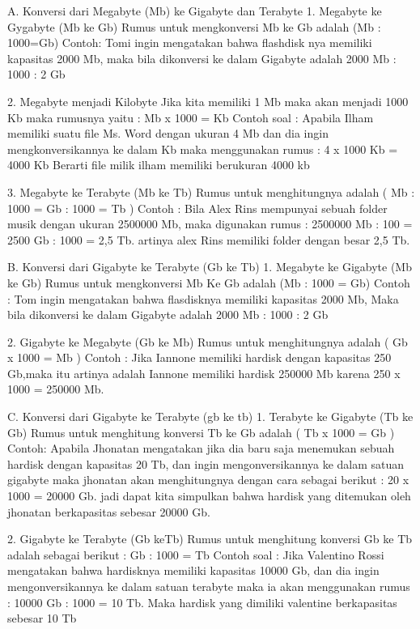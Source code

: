 A.	Konversi dari Megabyte (Mb) ke Gigabyte dan Terabyte
1.	Megabyte ke Gygabyte (Mb ke Gb)
	Rumus untuk mengkonversi Mb ke Gb adalah (Mb : 1000=Gb)
	Contoh: 
	Tomi ingin mengatakan bahwa flashdisk nya memiliki kapasitas 2000 Mb, maka bila dikonversi  ke dalam Gigabyte adalah 2000 Mb : 1000 : 2 Gb 

2.	Megabyte menjadi Kilobyte
Jika kita memiliki 1 Mb maka akan menjadi 1000 Kb maka rumusnya yaitu :
Mb x 1000 = Kb
Contoh soal :
Apabila Ilham memiliki suatu file Ms. Word dengan ukuran 4 Mb dan dia ingin mengkonversikannya ke dalam Kb maka menggunakan rumus :
4 x 1000 Kb = 4000 Kb
Berarti file milik ilham memiliki berukuran 4000 kb

3.	Megabyte ke Terabyte (Mb ke Tb)
Rumus untuk menghitungnya adalah ( Mb : 1000 = Gb : 1000 = Tb )
Contoh :
Bila Alex Rins mempunyai sebuah folder musik dengan ukuran 2500000 Mb, maka digunakan rumus : 2500000 Mb : 100 = 2500 Gb : 1000 = 2,5 Tb.
artinya alex Rins memiliki folder dengan besar 2,5 Tb.

B.	Konversi dari Gigabyte ke Terabyte (Gb ke Tb)
1.	Megabyte ke Gigabyte (Mb ke Gb)
Rumus untuk mengkonversi Mb Ke Gb adalah (Mb : 1000 = Gb)
Contoh :
Tom ingin mengatakan bahwa flasdisknya memiliki kapasitas 2000 Mb, Maka bila dikonversi ke dalam Gigabyte adalah 2000 Mb : 1000 : 2 Gb

2.	Gigabyte ke Megabyte (Gb ke Mb)
Rumus untuk menghitungnya adalah ( Gb x 1000 = Mb )
Contoh :
Jika Iannone memiliki hardisk dengan kapasitas 250 Gb,maka itu artinya adalah Iannone memiliki hardisk 250000 Mb karena 250 x 1000 = 250000 Mb.

C. Konversi dari Gigabyte ke Terabyte (gb ke tb)
1. Terabyte ke Gigabyte (Tb ke Gb)
Rumus untuk menghitung konversi Tb ke Gb adalah ( Tb x 1000 = Gb )
Contoh:
Apabila Jhonatan mengatakan jika dia baru saja menemukan sebuah hardisk dengan kapasitas 20 Tb, dan ingin mengonversikannya ke dalam satuan gigabyte maka jhonatan akan menghitungnya dengan cara sebagai berikut :
20 x 1000 = 20000 Gb.
jadi dapat kita simpulkan bahwa  hardisk yang ditemukan oleh jhonatan berkapasitas sebesar 20000 Gb.

2.	Gigabyte ke Terabyte (Gb keTb)
Rumus untuk menghitung konversi Gb ke Tb  adalah sebagai berikut :
 Gb : 1000 = Tb
Contoh soal :
Jika Valentino Rossi mengatakan bahwa hardisknya memiliki kapasitas 10000 Gb, dan dia ingin mengonversikannya ke dalam satuan terabyte maka ia akan menggunakan rumus :
10000 Gb : 1000 = 10 Tb.
Maka hardisk yang dimiliki valentine berkapasitas sebesar 10 Tb

